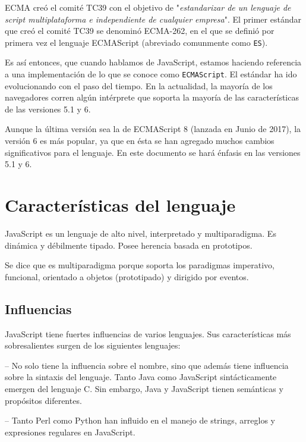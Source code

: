 ECMA creó el comité TC39 con el objetivo de "\emph{estandarizar de un lenguaje de script multiplataforma e independiente de cualquier empresa}". El primer estándar que creó el comité TC39 se denominó ECMA-262, en el que se definió por primera vez el lenguaje ECMAScript (abreviado comunmente como \texttt{ES}).

Es así entonces, que cuando hablamos de JavaScript, estamos haciendo referencia a una implementación de lo que se conoce como \texttt{ECMAScript}. El estándar ha ido evolucionando con el paso del tiempo. En la actualidad, la mayoría de los navegadores corren algún intérprete que soporta la mayoría de las características de las versiones 5.1 y 6. 

Aunque la última versión sea la de ECMAScript 8 (lanzada en Junio de 2017), la versión 6 es más popular, ya que en ésta se han agregado muchos cambios significativos para el lenguaje. En este documento se hará énfasis en las versiones 5.1 y 6.


\section{Características del lenguaje}

JavaScript es un lenguaje de alto nivel, interpretado y multiparadigma. Es dinámica y débilmente tipado. Posee herencia basada en prototipos. 

Se dice que es multiparadigma porque soporta los paradigmas imperativo, funcional, orientado a objetos (prototipado) y dirigido por eventos.

\subsection{Influencias}

JavaScript tiene fuertes influencias de varios lenguajes. Sus características más sobresalientes surgen de los siguientes lenguajes: 

 -- No solo tiene la influencia sobre el nombre, sino que además tiene influencia sobre la sintaxis del lenguaje. Tanto Java como JavaScript sintácticamente emergen del lenguaje C. Sin embargo, Java y JavaScript tienen semánticas y propósitos diferentes.

 -- Tanto Perl como Python han influido en el manejo de strings, arreglos y expresiones regulares en JavaScript.

